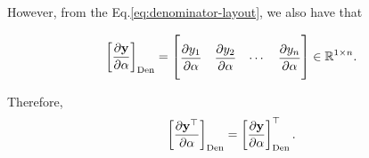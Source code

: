 \documentclass{article}
\begin{document}
However, from the Eq.\eqref{eq:denominator-layout}, we also have that

\begin{align}
    \left[\dfrac{\partial \mathbf{y}}{\partial \alpha}\right]_{\textnormal{Den}} = \renewcommand{\arraystretch}{2.6}\begin{bmatrix}
        \dfrac{\partial y_{1}}{\partial \alpha} &
        \dfrac{\partial y_{2}}{\partial \alpha} &
        \cdots &
        \dfrac{\partial y_{n}}{\partial \alpha}\vspace{1.3ex}
    \end{bmatrix} \in \mathbb{R}^{1\times n}.
\end{align}

Therefore,
\begin{align}
    \left[\dfrac{\partial \mathbf{y}^\top}{\partial \alpha}\right]_{\textnormal{Den}} = \left[\dfrac{\partial \mathbf{y}}{\partial \alpha}\right]_{\textnormal{Den}}^\top.
\end{align}
\end{document}
